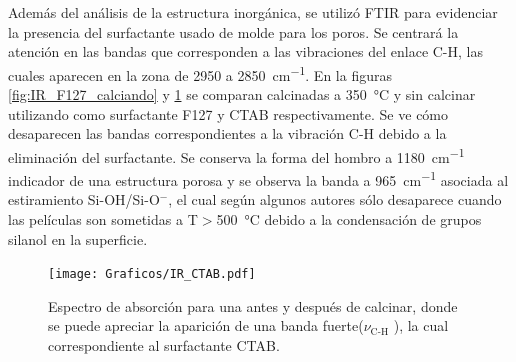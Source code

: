 		 Además del análisis de la estructura inorgánica, se utilizó FTIR para evidenciar la presencia del surfactante usado de molde para los poros. Se centrará la atención en las bandas que corresponden a las vibraciones del enlace C-H, las cuales aparecen en la zona de 2950 a \SI{2850}{\cm^{-1}}. En la figuras \ref{fig:IR_F127_calciando} y \ref{fig:IR_CTAB_calcinado} se comparan \pdm\space calcinadas a \SI{350}{\celsius} y sin calcinar utilizando como surfactante F127 y CTAB respectivamente. Se ve cómo desaparecen las bandas correspondientes a la vibración C-H debido a la eliminación del surfactante. Se conserva la forma del hombro a \SI{1180}{\cm^{-1}} indicador de una estructura porosa y se observa la banda a \SI{965}{\cm^{-1}} asociada al estiramiento Si-OH/Si-O$^-$, el cual según algunos autores sólo desaparece cuando las películas son sometidas a T$>$\SI{500}{\celsius} debido a la condensación de grupos silanol en la superficie.\cite{Innocenzi2003,Almeida1990,Bertoluzza1982}

		 		\begin{figure}[t!]
						\begin{center}
						\texttt{[image: Graficos/IR\_CTAB.pdf]}
						\caption[FTIR para una \pdmC.]{Espectro de absorción para una \pdmC\space antes y después de calcinar, donde se puede apreciar la aparición de una banda fuerte($\nu_\text{C-H}$ ), la cual correspondiente al surfactante CTAB.}
						\label{fig:IR_CTAB_calcinado}
						\end{center}
						\end{figure}

